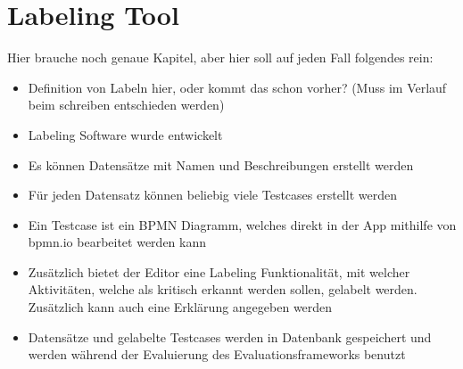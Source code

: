 \section{Labeling Tool}\label{sec:labeling-tool}

Hier brauche noch genaue Kapitel, aber hier soll auf jeden Fall folgendes rein:
\begin{itemize}
    \item Definition von Labeln hier, oder kommt das schon vorher? (Muss im Verlauf beim schreiben entschieden werden)
    \item Labeling Software wurde entwickelt
    \item Es können Datensätze mit Namen und Beschreibungen erstellt werden
    \item Für jeden Datensatz können beliebig viele Testcases erstellt werden
    \item Ein Testcase ist ein BPMN Diagramm, welches direkt in der App mithilfe von bpmn.io bearbeitet werden kann
    \item Zusätzlich bietet der Editor eine Labeling Funktionalität, mit welcher Aktivitäten, welche als kritisch erkannt werden sollen, gelabelt werden. Zusätzlich kann auch eine Erklärung angegeben werden
    \item Datensätze und gelabelte Testcases werden in Datenbank gespeichert und werden während der Evaluierung des Evaluationsframeworks benutzt
\end{itemize}